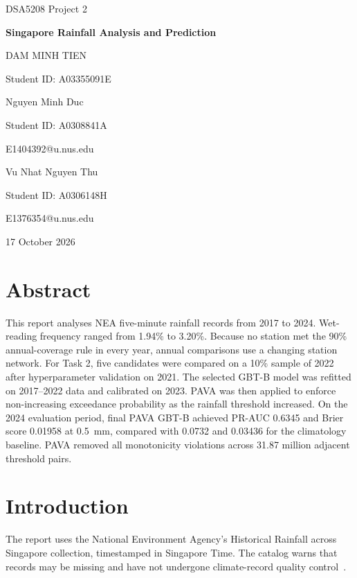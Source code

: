 \documentclass[11pt,a4paper]{article}
\newcommand{\projecttitle}{Singapore Rainfall Analysis and Prediction}
\begin{document}
\hypersetup{pageanchor=false}
\begin{titlepage}
  \centering
  \vspace*{35mm}
  {\Large DSA5208 Project 2\par}
  \vspace{10mm}
  {\LARGE\bfseries \projecttitle\par}
  \vfill
  {\large DAM MINH TIEN\par}
  {\normalsize Student ID: A03355091E\par}
  \vspace{4mm}
  {\large Nguyen Minh Duc\par}
  {\normalsize Student ID: A0308841A\par}
  {\normalsize E1404392@u.nus.edu\par}
  \vspace{4mm}
  {\large Vu Nhat Nguyen Thu\par}
  {\normalsize Student ID: A0306148H\par}
  {\normalsize E1376354@u.nus.edu\par}
  \vspace{10mm}
  {\large 17 October 2026\par}
\end{titlepage}

\hypersetup{pageanchor=true}
\section*{Abstract}
This report analyses NEA five-minute rainfall records from 2017 to 2024. Wet-
reading frequency ranged from 1.94\% to 3.20\%. Because no station met the
90\% annual-coverage rule in every year, annual comparisons use a changing
station network. For Task 2, five candidates were compared on a 10\% sample
of 2022 after hyperparameter validation on 2021. The selected GBT-B model was
refitted on 2017--2022 data and calibrated on 2023. PAVA was then applied to
enforce non-increasing exceedance probability as the rainfall threshold
increased. On the 2024 evaluation period, final PAVA GBT-B achieved PR-AUC
0.6345 and Brier score 0.01958 at 0.5~mm, compared with 0.0732 and 0.03436
for the climatology baseline. PAVA removed all monotonicity violations across
31.87 million adjacent threshold pairs.

\begingroup
\small
\setlength{\parskip}{0pt}
\tableofcontents
\endgroup
\clearpage
{}

\section{Introduction}
The report uses the National Environment Agency's Historical Rainfall across
Singapore collection, timestamped in Singapore Time. The catalog warns that
records may be missing and have not undergone climate-record quality control~\cite{nea}.
\end{document}
